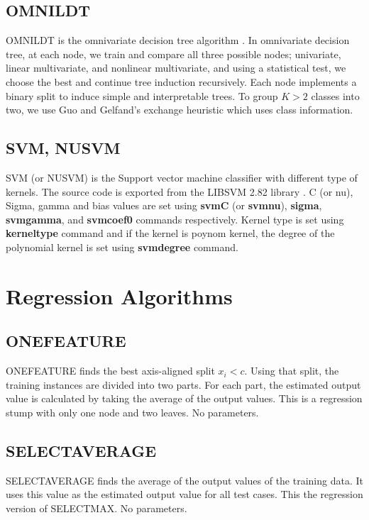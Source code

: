 \documentclass[a4paper,12pt]{book}
\begin{document}
\subsection{OMNILDT}
OMNILDT is the omnivariate decision tree algorithm \cite{yildiz01}. In omnivariate decision tree, at each node, we train and compare all three possible nodes; univariate, linear multivariate, and nonlinear multivariate, and using a statistical test, we choose the best and continue tree induction recursively. Each node implements a binary split to induce simple and interpretable trees. To group $K>2$ classes into two, we use Guo and Gelfand's \cite{guo92} exchange heuristic which uses class information.

\subsection{SVM, NUSVM}
SVM (or NUSVM) is the Support vector machine classifier with different type of kernels. The source code is exported from the LIBSVM 2.82 library \cite{libsvm}. C (or nu), Sigma, gamma and bias values are set using {\bf svmC} (or {\bf svmnu}), {\bf sigma}, {\bf svmgamma}, and {\bf svmcoef0} commands respectively. Kernel type is set using {\bf kerneltype} command and if the kernel is poynom kernel, the degree of the polynomial kernel is set using {\bf svmdegree} command.

\section{Regression Algorithms}

\subsection{ONEFEATURE}
ONEFEATURE finds the best axis-aligned split $x_i < c$. Using that split, the training instances are divided into two parts. For each part, the estimated output value is calculated by taking the average of the output values. This is a regression stump with only one node and two leaves. No parameters.

\subsection{SELECTAVERAGE}
SELECTAVERAGE finds the average of the output values of the training data. It uses this value as the estimated output value for all test cases. This the regression version of SELECTMAX. No parameters.
\end{document}
